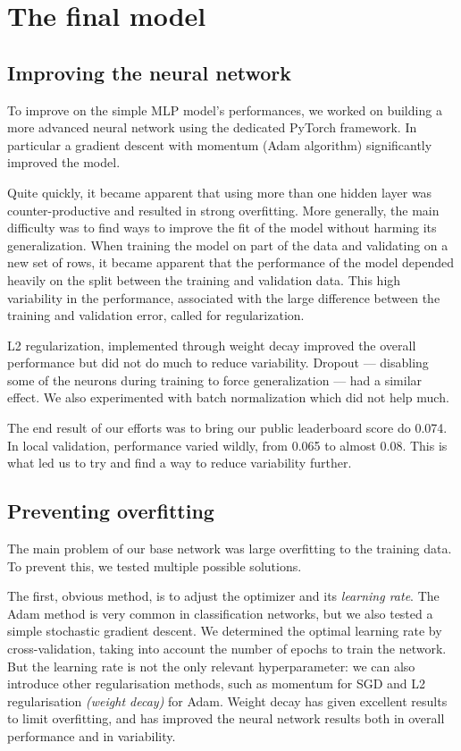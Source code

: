 \documentclass[a4paper,11pt,openany,extrafontsizes,oneside,article]{memoir}
\begin{document}
\chapter{The final model}

\section{Improving the neural network}

To improve on the simple MLP model's performances, we worked on
building a more advanced neural network using the dedicated PyTorch
framework. In particular a gradient descent with momentum (Adam
algorithm) significantly improved the model.

Quite quickly, it became apparent that using more than one hidden
layer was counter-productive and resulted in strong overfitting. More
generally, the main difficulty was to find ways to improve the fit of
the model without harming its generalization. When training the model
on part of the data and validating on a new set of rows, it became
apparent that the performance of the model depended heavily on the
split between the training and validation data. This high variability
in the performance, associated with the large difference between the
training and validation error, called for regularization.

L2 regularization, implemented through weight decay improved the
overall performance but did not do much to reduce variability. Dropout
--- disabling some of the neurons during training to force
generalization --- had a similar effect. We also experimented with
batch normalization which did not help much.

The end result of our efforts was to bring our public leaderboard
score do 0.074. In local validation, performance varied wildly, from
0.065 to almost 0.08. This is what led us to try and find a way to
reduce variability further.

\section{Preventing overfitting}

The main problem of our base network was large overfitting to the
training data. To prevent this, we tested multiple possible solutions.

The first, obvious method, is to adjust the optimizer and its
\emph{learning rate}. The Adam method is very common in classification
networks, but we also tested a simple stochastic gradient descent. We
determined the optimal learning rate by cross-validation, taking into
account the number of epochs to train the network. But the learning
rate is not the only relevant hyperparameter: we can also introduce
other regularisation methods, such as momentum for SGD and L2
regularisation \emph{(weight decay)} for Adam. Weight decay has given
excellent results to limit overfitting, and has improved the neural
network results both in overall performance and in variability.
\end{document}
